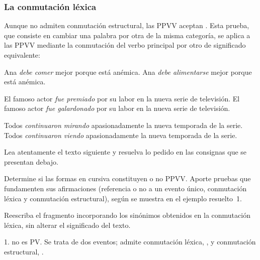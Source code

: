 \subsubsection{La conmutación léxica}\label{sec:11-lexica}

Aunque no admiten conmutación estructural, las PPVV aceptan . Esta prueba, que consiste en cambiar una palabra por otra de la misma
categoría, se aplica a las PPVV mediante la conmutación del verbo principal por
otro de significado equivalente:

\begin{exe}
  \ex
    \begin{xlist}
      \ex Ana \textit{debe comer} mejor porque está anémica.
      \ex Ana \textit{debe alimentarse} mejor porque está anémica.
    \end{xlist}
  \ex
    \begin{xlist}
      \ex El famoso actor \textit{fue premiado} por su labor en la nueva serie
          de televisión.
      \ex El famoso actor \textit{fue galardonado} por su labor en la nueva
          serie de televisión.
    \end{xlist}
  \ex
    \begin{xlist}
      \ex Todos \textit{continuaron mirando} apasionadamente la nueva temporada
          de la serie.
      \ex Todos \textit{continuaron viendo} apasionadamente la nueva temporada
          de la serie.
    \end{xlist}
\end{exe}

\begin{ejercicio}\label{ej:11-series}
Lea atentamente el texto siguiente y resuelva lo pedido en las consignas que se
presentan debajo.


\begin{consignas}
  \item Determine si las formas en cursiva constituyen o no PPVV. Aporte pruebas
        que fundamenten sus afirmaciones (referencia o no a un evento único,
        conmutación léxica y conmutación estructural), según se muestra en el
        ejemplo resuelto~1.
  \item Reescriba el fragmento incorporando los sinónimos obtenidos en la
        conmutación léxica, sin alterar el significado del texto.
\end{consignas}

\begin{resuelto}
1.  no es PV. Se trata de dos eventos; admite
conmutación léxica, , y conmutación estructural,
.
\end{resuelto}
\end{ejercicio}

